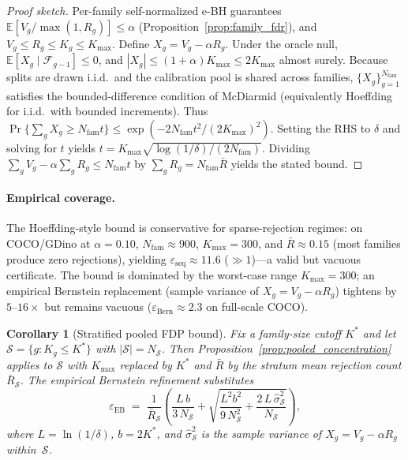 \documentclass{article}
\newtheorem{corollary}{Corollary}
\theoremstyle{remark}
\newcommand{\1}{\mathbf{1}}
\begin{document}
\begin{proof}[Proof sketch]
Per-family self-normalized e-BH guarantees
$\mathbb{E}[V_g / \max(1, R_g)]\le\alpha$
(Proposition~\ref{prop:family_fdr}), and $V_g\le R_g\le K_g\le K_{\max}$.
Define $X_g = V_g - \alpha R_g$. Under the oracle null,
$\mathbb{E}[X_g\mid \mathcal F_{g-1}]\le 0$, and
$|X_g|\le(1+\alpha)K_{\max}\le 2K_{\max}$ almost surely. Because splits
are drawn i.i.d.\ and the calibration pool is shared across families,
$\{X_g\}_{g=1}^{N_{\mathrm{fam}}}$ satisfies the bounded-difference
condition of McDiarmid (equivalently Hoeffding for i.i.d.\ with bounded
increments). Thus
$\Pr\{\sum_g X_g \ge N_{\mathrm{fam}} t\}
  \le \exp(-2 N_{\mathrm{fam}} t^2 / (2 K_{\max})^2)$.
Setting the RHS to $\delta$ and solving for $t$ yields
$t = K_{\max}\sqrt{\log(1/\delta)/(2 N_{\mathrm{fam}})}$. Dividing
$\sum_g V_g - \alpha \sum_g R_g \le N_{\mathrm{fam}} t$ by
$\sum_g R_g = N_{\mathrm{fam}} \bar R$ yields the stated bound.
\end{proof}

\paragraph{Empirical coverage.}
The Hoeffding-style bound is conservative for sparse-rejection regimes:
on COCO/GDino at $\alpha\!=\!0.10$, $N_{\mathrm{fam}}\!\approx\!900$,
$K_{\max}\!=\!300$, and $\bar R\!\approx\!0.15$
(most families produce zero rejections), yielding
$\varepsilon_{\mathrm{seq}}\!\approx\!11.6$ ($\gg\!1$)---a valid but
vacuous certificate. The bound is dominated by the worst-case range
$K_{\max}\!=\!300$; an empirical Bernstein replacement
(sample variance of $X_g\!=\!V_g - \alpha R_g$) tightens by
$5$--$16\times$ but remains vacuous
($\varepsilon_{\mathrm{Bern}}\!\approx\!2.3$ on full-scale COCO).

\begin{corollary}[Stratified pooled FDP bound]
\label{cor:stratified_pooled}
Fix a family-size cutoff $K^*$ and let
$\mathcal{S}\!=\!\{g : K_g \le K^*\}$ with
$|\mathcal{S}| = N_{\mathcal{S}}$. Then
Proposition~\ref{prop:pooled_concentration} applies to $\mathcal{S}$
with $K_{\max}$ replaced by $K^*$ and $\bar R$ by the stratum mean
rejection count $\bar R_{\mathcal{S}}$. The empirical Bernstein
refinement substitutes
\[
\varepsilon_{\mathrm{EB}}
\;=\;
\frac{1}{\bar R_{\mathcal{S}}}
\left(
  \frac{L\,b}{3\,N_{\mathcal{S}}}
  + \sqrt{\frac{L^2 b^2}{9\,N_{\mathcal{S}}^2}
    + \frac{2\,L\,\hat\sigma_{\mathcal{S}}^2}{N_{\mathcal{S}}}}
\right),
\]
where $L\!=\!\ln(1/\delta)$, $b\!=\!2K^*$, and
$\hat\sigma_{\mathcal{S}}^2$ is the sample variance of
$X_g\!=\!V_g - \alpha R_g$ within~$\mathcal{S}$.
\end{corollary}
\end{document}
